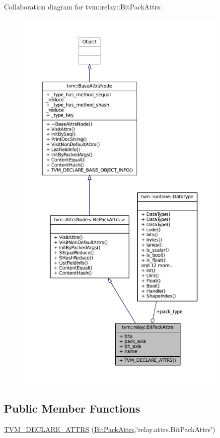 Collaboration diagram for tvm\+:\+:relay\+:\+:Bit\+Pack\+Attrs\+:
\nopagebreak
\begin{figure}[H]
\begin{center}
\leavevmode
\includegraphics[height=550pt]{structtvm_1_1relay_1_1BitPackAttrs__coll__graph}
\end{center}
\end{figure}
\subsection*{Public Member Functions}
\begin{DoxyCompactItemize}
\item 
\hyperlink{structtvm_1_1relay_1_1BitPackAttrs_a80b5837f3ad3ee61f95feb280eabbd3f}{T\+V\+M\+\_\+\+D\+E\+C\+L\+A\+R\+E\+\_\+\+A\+T\+T\+RS} (\hyperlink{structtvm_1_1relay_1_1BitPackAttrs}{Bit\+Pack\+Attrs},\char`\"{}relay.\+attrs.\+Bit\+Pack\+Attrs\char`\"{})
\end{DoxyCompactItemize}
